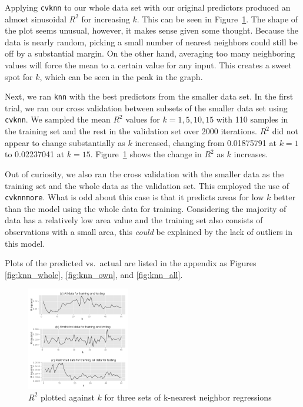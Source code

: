 \documentclass{article}
\begin{document}
Applying \verb=cvknn= to our whole data set with our original predictors
produced an almost sinusoidal $R^2$ for increasing $k$. This can be seen in
Figure~\ref{fig:r2knn}. The shape of the plot seems unusual, however, it
makes sense given some thought. Because the data is nearly random, picking a
small number of nearest neighbors could still be off by a substantial margin.
On the other hand, averaging too many neighboring values will force the mean to
a certain value for any input. This creates a sweet spot for $k$, which can be
seen in the peak in the graph.

Next, we ran \verb=knn= with the best predictors from the smaller data set. In
the first trial, we ran our cross validation between subsets of the smaller
data set using \verb=cvknn=. We sampled the mean $R^2$ values for $k=1,5,10,15$
with 110 samples in the training set and the rest in the validation set over
2000 iterations. $R^2$ did not appear to change substantially as $k$ increased,
changing from 0.01875791 at $k=1$ to 0.02237041 at $k=15$.
Figure~\ref{fig:r2knn} shows the change in $R^2$ as $k$ increases.

Out of curiosity, we also ran the cross validation with the smaller data as the
training set and the whole data as the validation set. This employed the use of
\verb=cvknnmore=. What is odd about this case is that it predicts areas for
low $k$ better than the model using the whole data for training. Considering
the majority of data has a relatively low area value and the training set also
consists of observations with a small area, this \emph{could} be explained by
the lack of outliers in this model.

Plots of the predicted vs.\ actual are listed in the appendix as
Figures \ref{fig:knn_whole}, \ref{fig:knn_own}, and \ref{fig:knn_all}.

\begin{figure}
  \centering
  \includegraphics[width=0.4\textwidth]{figures/r2knn.png}
  \caption{$R^2$ plotted against $k$ for three sets of k-nearest neighbor
  regressions}
  \label{fig:r2knn}
\end{figure}
\end{document}

